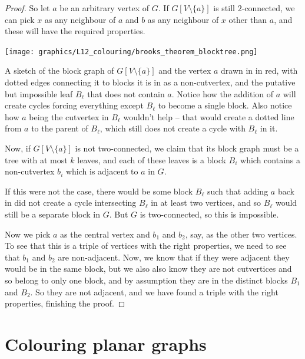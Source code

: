 \documentclass[nobib]{tufte-handout}
\begin{document}
\begin{theorem}[Brooks, 1941]
\begin{proof}
    So let $a$ be an arbitrary vertex of $G$. If $G[V \setminus \{a\}]$ is still $2$-connected, we can pick $x$ as any neighbour of $a$ and $b$ as any neighbour of $x$ other than $a$, and these will have the required properties.

    \begin{marginfigure}
      \centering
      \texttt{[image: graphics/L12\_colouring/brooks\_theorem\_blocktree.png]}
      \caption{A sketch of the block graph of $G[V \setminus \{a\}]$ and the vertex $a$ drawn in in red, with dotted edges connecting it to blocks it is in as a non-cutvertex, and the putative but impossible leaf $B_\ell$ that does not contain $a$. Notice how the addition of $a$ will create cycles forcing everything except $B_\ell$ to become a single block. Also notice how $a$ being the cutvertex in $B_\ell$ wouldn't help -- that would create a dotted line from $a$ to the parent of $B_\ell$, which still does not create a cycle with $B_\ell$ in it.}
    \end{marginfigure}

    Now, if $G[V \setminus \{a\}]$ is not two-connected, we claim that its block graph must be a tree with at most $k$ leaves, and each of these leaves is a block $B_i$ which contains a non-cutvertex $b_i$ which is adjacent to $a$ in $G$. 
    
    If this were not the case, there would be some block $B_\ell$ such that adding $a$ back in did not create a cycle intersecting $B_\ell$ in at least two vertices, and so $B_\ell$ would still be a separate block in $G$. But $G$ is two-connected, so this is impossible.
    
    Now we pick $a$ as the central vertex and $b_1$ and $b_2$, say, as the other two vertices. To see that this is a triple of vertices with the right properties, we need to see that $b_1$ and $b_2$ are non-adjacent. Now, we know that if they were adjacent they would be in the same block, but we also also know they are not cutvertices and so belong to only one block, and by assumption they are in the distinct blocks $B_1$ and $B_2$. So they are not adjacent, and we have found a triple with the right properties, finishing the proof.
  \end{proof}
\end{theorem}

\section{Colouring planar graphs}
\end{document}
